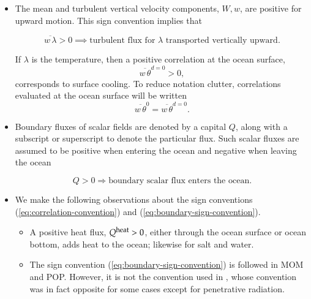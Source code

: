 \begin{itemize}
\item \label{w_W_defined} The mean and turbulent vertical velocity
  components, $W,w$, are positive for upward motion. This sign
  convention implies that
\begin{mdframed}[backgroundcolor=lightgray!50]
   \begin{equation}
  \overline{w \, \lambda}  > 0  \implies \mbox{turbulent flux for $\lambda$ transported vertically upward}.
\label{eq:correlation-convention}
\end{equation}
\end{mdframed}
If $\lambda$ is the temperature, then a positive correlation at the
ocean surface, 
\begin{equation}
 \overline{w \, \theta}^{d=0} > 0,
\end{equation}
corresponds to surface cooling.  To reduce notation clutter,
correlations evaluated at the ocean surface will be written
\begin{equation}
 \overline{w \, \theta}^{0} =  \overline{w \, \theta}^{d=0}.
\end{equation}

\item Boundary fluxes of scalar fields are denoted by a capital $Q$,
  along with a subscript or superscript to denote the particular flux.
  Such scalar fluxes are assumed to be positive when entering the
  ocean and negative when leaving the ocean
\begin{mdframed}[backgroundcolor=lightgray!50]
\begin{equation}
  Q > 0 \Rightarrow \mbox{boundary scalar flux enters the ocean.} 
\label{eq:boundary-sign-convention}
\end{equation}
\end{mdframed}


\item We make the following observations about the sign conventions
  (\ref{eq:correlation-convention}) and
  (\ref{eq:boundary-sign-convention}).
\begin{itemize}
\item A positive heat flux, $Q^{\mbox{\footnotesize heat}} > 0$,
  either through the ocean surface or ocean bottom, adds heat to the
  ocean; likewise for salt and water.

\item The sign convention (\ref{eq:boundary-sign-convention}) is
  followed in MOM and POP.  However, it is not the convention used in
  \cite{LargeKPP}, whose convention was in fact opposite for some
  cases except for penetrative radiation.


\end{itemize}
\end{itemize}

